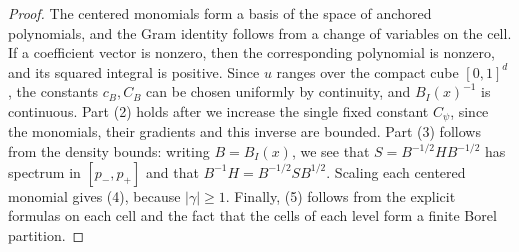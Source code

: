 \begin{proof}
The centered monomials form a basis of the space of anchored
polynomials, and the Gram identity follows from a change of variables
on the cell. If a coefficient vector is nonzero, then the corresponding
polynomial is nonzero, and its squared integral is positive. Since $u$
ranges over the compact cube $[0,1]^d$, the constants $c_B,C_B$ can be
chosen uniformly by continuity, and $B_I(x)^{-1}$ is continuous.
Part (2) holds after we increase the single fixed constant $C_\psi$,
since the monomials, their gradients and this inverse are bounded. Part (3) follows from the density bounds: writing $B=B_I(x)$, we see
that
$S=B^{-1/2}HB^{-1/2}$ has spectrum in $[p_-,p_+]$ and that
$B^{-1}H=B^{-1/2}SB^{1/2}$. Scaling each centered monomial gives (4),
because $|\gamma|\ge1$. Finally, (5) follows from the
explicit formulas on each cell and the fact that the cells of each
level form a finite Borel partition.
\end{proof}

